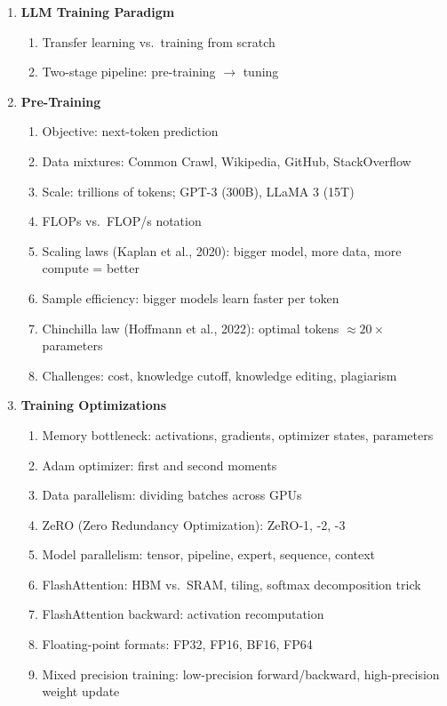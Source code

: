 \documentclass[11pt, a4paper]{article}
\begin{document}
\begin{enumerate}[label=\textbf{\arabic*.}, leftmargin=2em]
  \item \textbf{LLM Training Paradigm}
    \begin{enumerate}[label=\arabic{enumi}.\arabic*]
      \item Transfer learning vs.\ training from scratch
      \item Two-stage pipeline: pre-training $\to$ tuning
    \end{enumerate}

  \item \textbf{Pre-Training}
    \begin{enumerate}[label=\arabic{enumi}.\arabic*]
      \item Objective: next-token prediction
      \item Data mixtures: Common Crawl, Wikipedia, GitHub, StackOverflow
      \item Scale: trillions of tokens; GPT-3 (300B), LLaMA 3 (15T)
      \item FLOPs vs.\ FLOP/s notation
      \item Scaling laws (Kaplan et al., 2020): bigger model, more data, more compute = better
      \item Sample efficiency: bigger models learn faster per token
      \item Chinchilla law (Hoffmann et al., 2022): optimal tokens $\approx 20\times$ parameters
      \item Challenges: cost, knowledge cutoff, knowledge editing, plagiarism
    \end{enumerate}

  \item \textbf{Training Optimizations}
    \begin{enumerate}[label=\arabic{enumi}.\arabic*]
      \item Memory bottleneck: activations, gradients, optimizer states, parameters
      \item Adam optimizer: first and second moments
      \item Data parallelism: dividing batches across GPUs
      \item ZeRO (Zero Redundancy Optimization): ZeRO-1, -2, -3
      \item Model parallelism: tensor, pipeline, expert, sequence, context
      \item FlashAttention: HBM vs.\ SRAM, tiling, softmax decomposition trick
      \item FlashAttention backward: activation recomputation
      \item Floating-point formats: FP32, FP16, BF16, FP64
      \item Mixed precision training: low-precision forward/backward, high-precision weight update
    \end{enumerate}


\end{enumerate}
\end{document}
